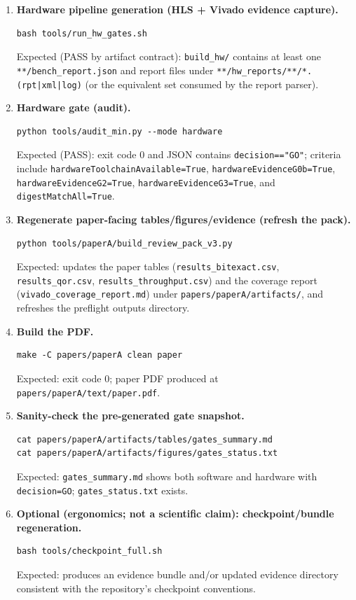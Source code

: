 \begin{enumerate}
\item \textbf{Hardware pipeline generation (HLS + Vivado evidence capture).}
\begin{verbatim}
bash tools/run_hw_gates.sh
\end{verbatim}
Expected (PASS by artifact contract): \texttt{build\_hw/} contains at least one \texttt{**/bench\_report.json} and report files under \texttt{**/hw\_reports/**/*.(rpt|xml|log)} (or the equivalent set consumed by the report parser).

\item \textbf{Hardware gate (audit).}
\begin{verbatim}
python tools/audit_min.py --mode hardware
\end{verbatim}
Expected (PASS): exit code 0 and JSON contains \texttt{decision=="GO"}; criteria include \texttt{hardwareToolchainAvailable=True}, \texttt{hardwareEvidenceG0b=True}, \texttt{hardwareEvidenceG2=True}, \texttt{hardwareEvidenceG3=True}, and \texttt{digestMatchAll=True}.

\item \textbf{Regenerate paper-facing tables/figures/evidence (refresh the pack).}
\begin{verbatim}
python tools/paperA/build_review_pack_v3.py
\end{verbatim}
Expected: updates the paper tables (\texttt{results\_bitexact.csv}, \texttt{results\_qor.csv}, \texttt{results\_throughput.csv}) and the coverage report (\texttt{vivado\_coverage\_report.md}) under \texttt{papers/paperA/artifacts/}, and refreshes the preflight outputs directory.

\item \textbf{Build the PDF.}
\begin{verbatim}
make -C papers/paperA clean paper
\end{verbatim}
Expected: exit code 0; paper PDF produced at \texttt{papers/paperA/text/paper.pdf}.

\item \textbf{Sanity-check the pre-generated gate snapshot.}
\begin{verbatim}
cat papers/paperA/artifacts/tables/gates_summary.md
cat papers/paperA/artifacts/figures/gates_status.txt
\end{verbatim}
Expected: \texttt{gates\_summary.md} shows both software and hardware with \texttt{decision=GO}; \texttt{gates\_status.txt} exists.

\item \textbf{Optional (ergonomics; not a scientific claim): checkpoint/bundle regeneration.}
\begin{verbatim}
bash tools/checkpoint_full.sh
\end{verbatim}
Expected: produces an evidence bundle and/or updated evidence directory consistent with the repository's checkpoint conventions.
\end{enumerate}

